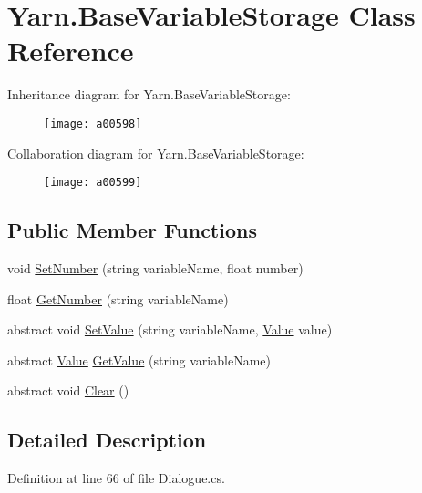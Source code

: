 \hypertarget{a00036}{\section{Yarn.\-Base\-Variable\-Storage Class Reference}
\label{a00036}
}


Inheritance diagram for Yarn.\-Base\-Variable\-Storage\-:
\nopagebreak
\begin{figure}[H]
\begin{center}
\leavevmode
\texttt{[image: a00598]}
\end{center}
\end{figure}


Collaboration diagram for Yarn.\-Base\-Variable\-Storage\-:
\nopagebreak
\begin{figure}[H]
\begin{center}
\leavevmode
\texttt{[image: a00599]}
\end{center}
\end{figure}
\subsection*{Public Member Functions}
\begin{DoxyCompactItemize}
\item 
void \hyperlink{a00036_a48b93de9cd7ae61d0cd9583c8330d3ee}{Set\-Number} (string variable\-Name, float number)
\item 
float \hyperlink{a00036_a1b7f7f4468b2463e7b47986d99362279}{Get\-Number} (string variable\-Name)
\item 
abstract void \hyperlink{a00036_a1c57d6d208b78abec0a670396771448e}{Set\-Value} (string variable\-Name, \hyperlink{a00181}{Value} value)
\item 
abstract \hyperlink{a00181}{Value} \hyperlink{a00036_a13b142df804d9842e97e628e252928e8}{Get\-Value} (string variable\-Name)
\item 
abstract void \hyperlink{a00036_a7e45c37f3662ce9f2643e306bb2b3adc}{Clear} ()
\end{DoxyCompactItemize}


\subsection{Detailed Description}


Definition at line 66 of file Dialogue.\-cs.



